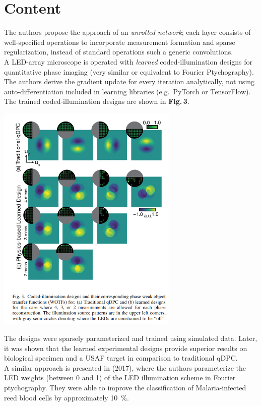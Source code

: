 \documentclass{article}
\begin{document}
\section*{Content}
The authors propose the approach of an \textit{unrolled network}; each layer consists of well-specified operations to incorporate measurement formation and sparse regularization, instead of standard operations such a generic convolutions.\\
A LED-array microscope is operated with \textit{learned} coded-illumination designs for quantitative phase imaging (very similar or equivalent to Fourier Ptychography). The authors derive the gradient update for every iteration analytically, not using auto-differentiation included in learning libraries (e.g.\, PyTorch or TensorFlow). The trained coded-illumination designs are shown in \textbf{Fig.\,3}.

\begin{center}
    \includegraphics[width=0.65\textwidth]{figures/codedillumination.png}
\end{center}

The designs were sparsely parameterized and trained using simulated data. Later, it was shown that the learned experimental designs provide superior results on biological specimen and a USAF target in comparison to traditional qDPC.\\
A similar approach is presented in \cite{Horstmeyer2017-hy} (2017), where the authors parameterize the LED weights (between 0 and 1) of the LED illumination scheme in Fourier ptychography. They were able to improve the classification of Malaria-infected reed blood cells by approximately \SI{10}{\percent}.
\end{document}
